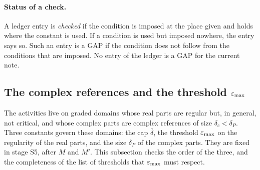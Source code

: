 \paragraph{Status of a check.} A ledger entry is \emph{checked} if the condition is imposed at the place given and holds where the constant is used. If a condition is used but imposed nowhere, the entry says so. Such an entry is a GAP if the condition does not follow from the conditions that are imposed. No entry of the ledger is a GAP for the current note.

\subsection{The complex references and the threshold \texorpdfstring{$\varepsilon_{\max}$}{eps-max}}\label{subsec:ledger-emax}

The activities live on graded domains whose real parts are regular but, in general, not critical, and whose complex parts are complex references of size $\delta_c<\delta_P$. Three constants govern these domains: the cap $\bar\delta$, the threshold $\varepsilon_{\max}$ on the regularity of the real parts, and the size $\delta_P$ of the complex parts. They are fixed in stage S5, after $M$ and $M'$. This subsection checks the order of the three, and the completeness of the list of thresholds that $\varepsilon_{\max}$ must respect.

